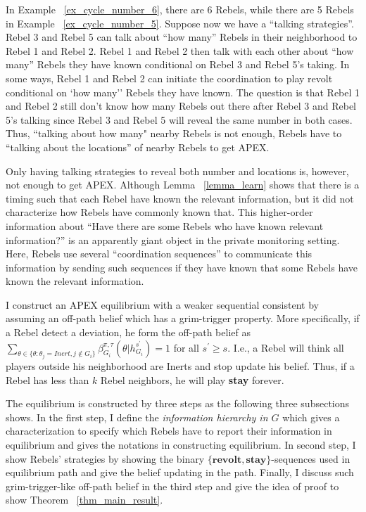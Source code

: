 \documentclass[12pt,letter]{article}
\theoremstyle{definition}
\theoremstyle{remark}
\theoremstyle{claim}
\begin{document}
In Example ~\ref{ex_cycle_number_6}, there are 6 Rebels, while there are 5 Rebels in Example ~\ref{ex_cycle_number_5}. Suppose now we have a ``talking strategies''. Rebel 3 and Rebel 5 can talk about ``how many'' Rebels in their neighborhood to Rebel 1 and Rebel 2. Rebel 1 and Rebel 2 then talk with each other about ``how many'' Rebels they have known conditional on Rebel 3 and Rebel 5's taking. In some ways, Rebel 1 and Rebel 2 can initiate the coordination to play revolt conditional on `how many'' Rebels they have known. The question is that Rebel 1 and Rebel 2 still don't know how many Rebels out there after Rebel 3 and Rebel 5's talking since Rebel 3 and Rebel 5 will reveal the same number in both cases. Thus, ``talking about how many" nearby Rebels is not enough, Rebels have to ``talking about the locations'' of nearby Rebels to get APEX. 

Only having talking strategies to reveal both number and locations is, however, not enough to get APEX. Although Lemma ~\ref{lemma_learn} shows that there is a timing such that each Rebel have known the relevant information, but it did not characterize how Rebels have commonly known that. This higher-order information about ``Have there are some Rebels who have known relevant information?'' is an apparently giant object in the private monitoring setting. Here, Rebels use several ``coordination sequences'' to communicate this information by sending such sequences if they have known that some Rebels have known the relevant information.

I construct an APEX equilibrium with a weaker sequential consistent by assuming an off-path belief which has a grim-trigger property. More specifically, if a Rebel detect a deviation, he form the off-path belief as $\sum_{\theta \in \{\theta:\theta_j=Inert,j\notin G_i\}}\beta^{\pi,\tau}_{G_i}({\theta}|h^{s^{'}}_{G_i})=1$ for all $s^{'}\geq s$. I.e., a Rebel will think all players outside his neighborhood are Inerts and stop update his belief. Thus, if a Rebel has less than $k$ Rebel neighbors, he will play \textbf{stay} forever. 

The equilibrium is constructed by three steps as the following three subsections shows. In the first step, I define the \textit{information hierarchy in $G$} which gives a characterization to specify which Rebels have to report their information in equilibrium and gives the notations in constructing equilibrium. In second step, I show Rebels' strategies by showing the binary $\{\textbf{revolt},\textbf{stay}\}$-sequences used in equilibrium path and give the belief updating in the path. Finally, I discuss such grim-trigger-like off-path belief in the third step and give the idea of proof to show Theorem ~\ref{thm_main_result}. 
\end{document}
